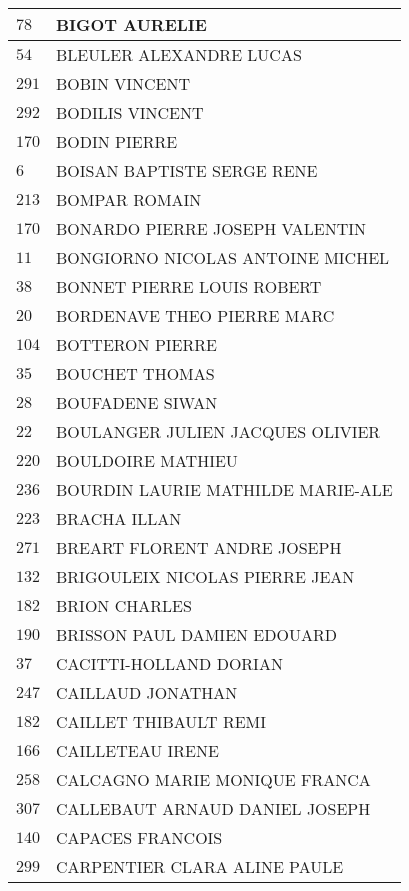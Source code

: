 \begin{xltabular}{\linewidth}{|l|X|}
    \hline
    $78$ & BIGOT AURELIE \\
    \hline
    $54$ & BLEULER ALEXANDRE LUCAS \\
    \hline
    $291$ & BOBIN VINCENT \\
    \hline
    $292$ & BODILIS VINCENT \\
    \hline
    $170$ & BODIN PIERRE \\
    \hline
    $6$ & BOISAN BAPTISTE SERGE RENE \\
    \hline
    $213$ & BOMPAR ROMAIN \\
    \hline
    $170$ & BONARDO PIERRE JOSEPH VALENTIN \\
    \hline
    $11$ & BONGIORNO NICOLAS ANTOINE MICHEL \\
    \hline
    $38$ & BONNET PIERRE LOUIS ROBERT \\
    \hline
    $20$ & BORDENAVE THEO PIERRE MARC \\
    \hline
    $104$ & BOTTERON PIERRE \\
    \hline
    $35$ & BOUCHET THOMAS \\
    \hline
    $28$ & BOUFADENE SIWAN \\
    \hline
    $22$ & BOULANGER JULIEN JACQUES OLIVIER \\
    \hline
    $220$ & BOULDOIRE MATHIEU \\
    \hline
    $236$ & BOURDIN LAURIE MATHILDE MARIE-ALE \\
    \hline
    $223$ & BRACHA ILLAN \\
    \hline
    $271$ & BREART FLORENT ANDRE JOSEPH \\
    \hline
    $132$ & BRIGOULEIX NICOLAS PIERRE JEAN \\
    \hline
    $182$ & BRION CHARLES \\
    \hline
    $190$ & BRISSON PAUL DAMIEN EDOUARD \\
    \hline
    $37$ & CACITTI-HOLLAND DORIAN \\
    \hline
    $247$ & CAILLAUD JONATHAN \\
    \hline
    $182$ & CAILLET THIBAULT REMI \\
    \hline
    $166$ & CAILLETEAU IRENE \\
    \hline
    $258$ & CALCAGNO MARIE MONIQUE FRANCA \\
    \hline
    $307$ & CALLEBAUT ARNAUD DANIEL JOSEPH \\
    \hline
    $140$ & CAPACES FRANCOIS \\
    \hline
    $299$ & CARPENTIER CLARA ALINE PAULE \\

\end{xltabular}
